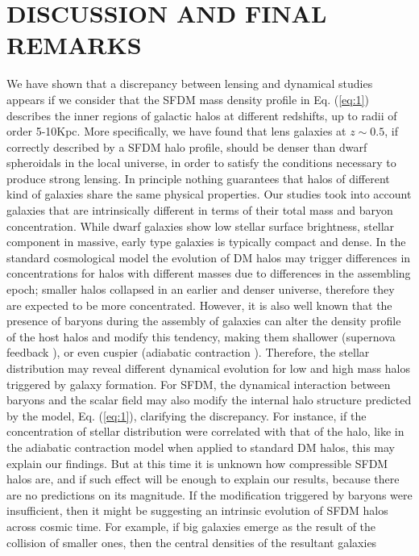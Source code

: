 \documentclass[10pt,letterpaper,twocolumn]{article}
\begin{document}
\section[IV]{\centering \small {DISCUSSION AND FINAL REMARKS}}
We have shown that a discrepancy between lensing and
dynamical studies appears if we consider that the SFDM
mass density profile in Eq. (\ref{eq:1}) describes the inner regions
of galactic halos at different redshifts, up to radii of order
5-10Kpc. More specifically, we have found that lens
galaxies at $z\sim 0.5$, if correctly described by a SFDM halo
profile, should be denser than dwarf spheroidals in the
local universe, in order to satisfy the conditions necessary
to produce strong lensing.
In principle nothing guarantees that halos of different
kind of galaxies share the same physical properties.
Our studies took into account galaxies that are intrinsically
different in terms of their total mass and baryon
concentration. While dwarf galaxies show low stellar surface
brightness, stellar component in massive, early type
galaxies is typically compact and dense.
In the standard cosmological model the evolution of
DM halos may trigger differences in concentrations for
halos with different masses due to differences in the assembling
epoch; smaller halos collapsed in an earlier and
denser universe, therefore they are expected to be more
concentrated. However, it is also well known that the
presence of baryons during the assembly of galaxies can
alter the density profile of the host halos and modify
this tendency, making them shallower (supernova feedback
\cite{22}), or even cuspier (adiabatic contraction \cite{24}).
Therefore, the stellar distribution may reveal different
dynamical evolution for low and high mass halos triggered
by galaxy formation.
For SFDM, the dynamical interaction between baryons
and the scalar field may also modify the internal halo
structure predicted by the model, Eq. (\ref{eq:1}), clarifying the
discrepancy. For instance, if the concentration of stellar
distribution were correlated with that of the halo,
like in the adiabatic contraction model when applied to
standard DM halos, this may explain our findings. But
at this time it is unknown how compressible SFDM halos
are, and if such effect will be enough to explain our
results, because there are no predictions on its magnitude.
If the modification triggered by baryons were insufficient, then it might be suggesting an intrinsic evolution
of SFDM halos across cosmic time. For example, if big
galaxies emerge as the result of the collision of smaller
ones, then the central densities of the resultant galaxies
\end{document}
